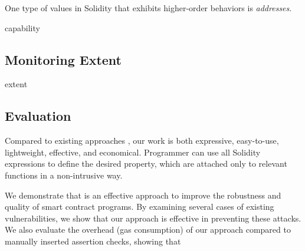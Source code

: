 One type of values in Solidity that exhibits higher-order behaviors is \emph{addresses}.

capability


\subsection*{\textbf{Monitoring Extent}}

extent



\subsection*{\textbf{Evaluation}}

Compared to existing approaches , our work is both expressive,
easy-to-use, lightweight, effective, and economical.
Programmer can use all Solidity expressions to define the desired property,
which are attached only to relevant functions in a non-intrusive way.

We demonstrate that \lang is an effective approach to improve the robustness
and quality of smart contract programs.
By examining several cases of existing vulnerabilities, we show that our
approach is effective in preventing these attacks.
We also evaluate the overhead (gas consumption) of our approach compared to
manually inserted assertion checks, showing that 






